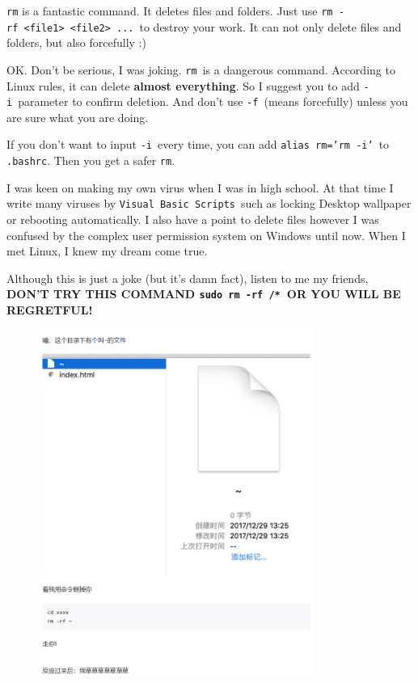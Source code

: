 \documentclass[12pt]{ctexart}
\newenvironment{mdquote}
{%
  \par\noindent
  \begin{list}{}{%
      \setlength{\leftmargin}{1em}%
      \setlength{\rightmargin}{0pt}%
      \setlength{\itemindent}{0pt}%
      \setlength{\listparindent}{\parindent}%
      \setlength{\topsep}{0.5\baselineskip}%
  }
  \item[\textbf{>}\ ]\itshape
}
{\end{list}\par}
\begin{document}
\texttt{rm} is a fantastic command. It deletes files and folders. Just
use
\texttt{rm\ -rf\ \textless{}file1\textgreater{}\ \textless{}file2\textgreater{}\ ...}\
to destroy your work. It can not only delete files and folders, but also
forcefully :)

OK. Don't be serious, I was joking. \texttt{rm}\ is a dangerous command.
According to Linux rules, it can delete \textbf{almost everything}. So I suggest
you to add \texttt{-i}\ parameter to confirm deletion. And don't use
\texttt{-f}\ (means forcefully) unless you are sure what you are doing.

\begin{mdquote}
If you don't want to input \texttt{-i}\ every time, you can add
\texttt{alias\ rm='rm\ -i'}\ to \texttt{.bashrc}. Then you get a
safer \texttt{rm}.
\end{mdquote}

I was keen on making my own virus when I was in high school. At that
time I write many viruses by \texttt{Visual\ Basic\ Scripts}\ such as
locking Desktop wallpaper or rebooting automatically. I also have a
point to delete files however I was confused by the complex user
permission system on Windows until now. When I met Linux, I knew my
dream come true.

\begin{mdquote}
Although this is just a joke (but it's damn fact),
listen to me my friends, \textbf{DON'T TRY THIS COMMAND
\texttt{sudo\ rm\ -rf\ /*}\ OR YOU WILL BE REGRETFUL!}
\end{mdquote}

\begin{figure}[H]
    \centering
    \includegraphics[width=0.8\textwidth,keepaspectratio]{assets/Linux/1.5 Linux file commands/6.png}
\end{figure}
\end{document}
